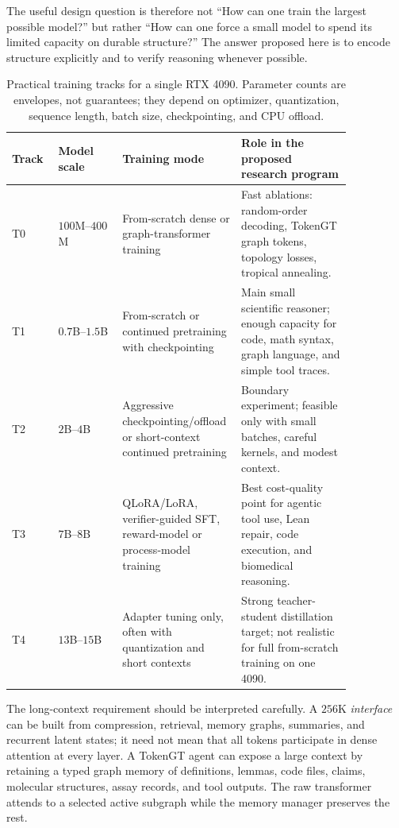 \documentclass[11pt]{article}
\newcommand{\1}{\mathbf{1}}
\begin{document}
The useful design question is therefore not ``How can one train the largest possible model?'' but rather ``How can one force a small model to spend its limited capacity on durable structure?'' The answer proposed here is to encode structure explicitly and to verify reasoning whenever possible.

\begin{table}[H]
\centering
\small
\caption{Practical training tracks for a single RTX 4090. Parameter counts are envelopes, not guarantees; they depend on optimizer, quantization, sequence length, batch size, checkpointing, and CPU offload.}
\label{tab:4090-tracks}
\begin{tabular}{p{0.13\linewidth}p{0.18\linewidth}p{0.23\linewidth}p{0.31\linewidth}}
\toprule
Track & Model scale & Training mode & Role in the proposed research program\\
\midrule
T0 & $100$M--$400$M & From-scratch dense or graph-transformer training & Fast ablations: random-order decoding, TokenGT graph tokens, topology losses, tropical annealing.\\
T1 & $0.7$B--$1.5$B & From-scratch or continued pretraining with checkpointing & Main small scientific reasoner; enough capacity for code, math syntax, graph language, and simple tool traces.\\
T2 & $2$B--$4$B & Aggressive checkpointing/offload or short-context continued pretraining & Boundary experiment; feasible only with small batches, careful kernels, and modest context.\\
T3 & $7$B--$8$B & QLoRA/LoRA, verifier-guided SFT, reward-model or process-model training & Best cost-quality point for agentic tool use, Lean repair, code execution, and biomedical reasoning.\\
T4 & $13$B--$15$B & Adapter tuning only, often with quantization and short contexts & Strong teacher-student distillation target; not realistic for full from-scratch training on one 4090.\\
\bottomrule
\end{tabular}
\end{table}

The long-context requirement should be interpreted carefully. A $256$K \emph{interface} can be built from compression, retrieval, memory graphs, summaries, and recurrent latent states; it need not mean that all tokens participate in dense attention at every layer. A TokenGT agent can expose a large context by retaining a typed graph memory of definitions, lemmas, code files, claims, molecular structures, assay records, and tool outputs. The raw transformer attends to a selected active subgraph while the memory manager preserves the rest.
\end{document}
